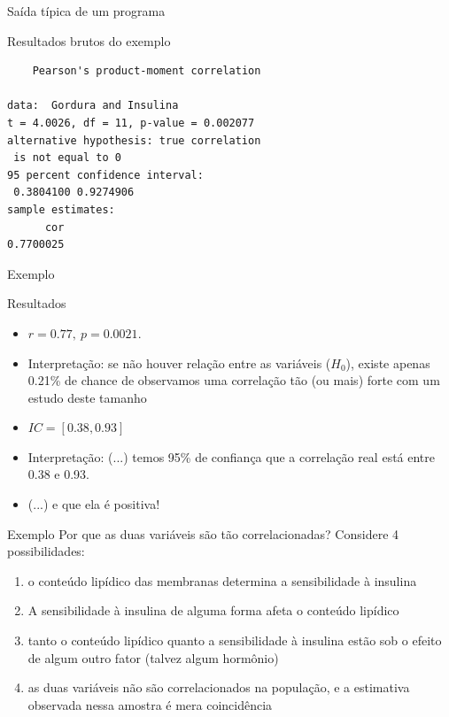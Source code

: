 \documentclass{beamer}
\begin{document}
\begin{frame}[fragile]{\scriptsize Saída típica de um programa}
  \begin{exampleblock}{Resultados brutos do exemplo}
    \scriptsize
\begin{verbatim}
	Pearson's product-moment correlation

data:  Gordura and Insulina
t = 4.0026, df = 11, p-value = 0.002077
alternative hypothesis: true correlation
 is not equal to 0
95 percent confidence interval:
 0.3804100 0.9274906
sample estimates:
      cor
0.7700025
\end{verbatim}
  \end{exampleblock}
\end{frame}

\begin{frame}{\scriptsize Exemplo}
  \begin{exampleblock}{Resultados}
    \footnotesize
    \begin{itemize}
      \footnotesize
    \item $r = 0.77,\ p=0.0021$.
    \item Interpretação: se não houver relação entre as variáveis
      ($H_0$), existe apenas 0.21\% de chance de observamos uma
      correlação tão (ou mais) forte com um estudo deste tamanho

      \bigskip
      \bigskip
    \item $IC = [0.38, 0.93]$
    \item Interpretação: (...) temos 95\% de confiança que a correlação real está entre 0.38 e 0.93.
    \item (...) e que ela é positiva!
    \end{itemize}
  \end{exampleblock}
\end{frame}

\begin{frame}{\scriptsize Exemplo}
  \small
  Por que as duas variáveis são tão correlacionadas? Considere 4
  possibilidades:
  \bigskip
  \begin{enumerate}
    \footnotesize
  \item o conteúdo lipídico das membranas \alert<1>{determina} a
    sensibilidade à insulina
    \bigskip
  \item A sensibilidade à insulina de alguma forma \alert<2>{afeta} o conteúdo lipídico
    \bigskip
  \item tanto o conteúdo lipídico quanto a sensibilidade à insulina
    estão sob o efeito de \alert<3>{algum outro} fator (talvez algum hormônio)
    \bigskip
  \item as duas variáveis não são correlacionados na população, e a
    estimativa observada nessa amostra é \alert<4>{mera coincidência}
  \end{enumerate}
\end{frame}
\end{document}

